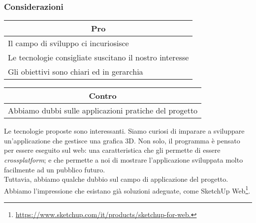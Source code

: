 \subsubsection{Considerazioni}
\begin{minipage}[t]{0.45\linewidth}
    \vspace{0pt}
    {\renewcommand{\arraystretch}{1.5}
    \begin{tabular}{p{1\linewidth}}
        \multicolumn{1}{c}{\textbf{Pro}} \\
        \midrule
		Il campo di sviluppo ci incuriosisce \\
		Le tecnologie consigliate suscitano il nostro interesse \\
		Gli obiettivi sono chiari ed in gerarchia \\

        \hline
    \end{tabular}
    }
\end{minipage}
\hspace{0.05\linewidth}
\begin{minipage}[t]{0.45\linewidth}
    \vspace{0pt}
    {\renewcommand{\arraystretch}{1.5}
    \begin{tabular}{p{1\linewidth}}
        \multicolumn{1}{c}{\textbf{Contro}} \\
        \midrule

		Abbiamo dubbi sulle applicazioni pratiche del progetto \\

        \hline
    \end{tabular}
    }
\end{minipage}
\vspace{1em}

Le tecnologie proposte sono interessanti. Siamo curiosi di imparare a sviluppare
un'applicazione che gestisce una grafica 3D. Non solo, il programma è pensato
per essere eseguito sul web: una caratteristica che gli permette di essere
\textit{crossplatform}; e che permette a noi di
mostrare l'applicazione sviluppata molto facilmente ad un pubblico futuro. \\
Tuttavia, abbiamo qualche dubbio sul campo di applicazione del progetto. Abbiamo
l'impressione che esistano già soluzioni adeguate, come SketchUp
Web\footnote{\label{footnote:sketchup}
\href{https://www.sketchup.com/it/products/sketchup-for-web}
{https://www.sketchup.com/it/products/sketchup-for-web.}}.
